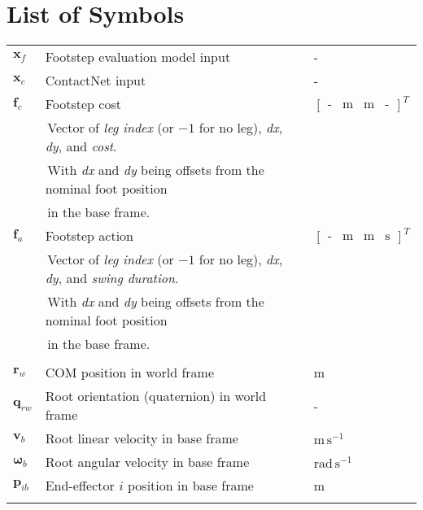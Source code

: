\chapter*{List of Symbols}

\begin{table}[h!]
  \centering
  \begin{tabular}{lll}
    $\mathbf x_f$ & Footstep evaluation model input & - \\
    $\mathbf x_c$ & ContactNet input & - \\
    $\mathbf f_c$ & Footstep cost & $
    \begin{bmatrix}
      \text{-} & \text{m} & \text{m} & \text{-}
    \end{bmatrix}^T$ \\
    & \,\footnotesize{Vector of \textit{leg index} (or $-1$ for no
    leg), \textit{dx}, \textit{dy}, and \textit{cost}.} & \\
    & \,\footnotesize{With \textit{dx} and \textit{dy} being offsets
    from the nominal foot position} & \\
    & \,\footnotesize{in the base frame.} & \\
    $\mathbf f_a$ & Footstep action & $
    \begin{bmatrix}
      \text{-} & \text{m} & \text{m} & \text{s}
    \end{bmatrix}^T$ \\
    & \,\footnotesize{Vector of \textit{leg index} (or $-1$ for no
    leg), \textit{dx}, \textit{dy}, and \textit{swing duration}.} & \\
    & \,\footnotesize{With \textit{dx} and \textit{dy} being offsets
    from the nominal foot position} & \\
    & \,\footnotesize{in the base frame.} & \\
    & & \\

    $\mathbf r_w$ & COM position in world frame & m \\
    $\mathbf q_{rw}$ & Root orientation (quaternion) in world frame & - \\
    $\mathbf v_b$ & Root linear velocity in base frame &
    $\text{m}\,\text{s}^{-1}$ \\
    $\mathbf \omega_b$ & Root angular velocity in base frame &
    $\text{rad}\,\text{s}^{-1}$ \\
    $\mathbf p_{ib}$ & End-effector $i$ position in base frame & m \\
    & & \\


\end{tabular}
\end{table}
